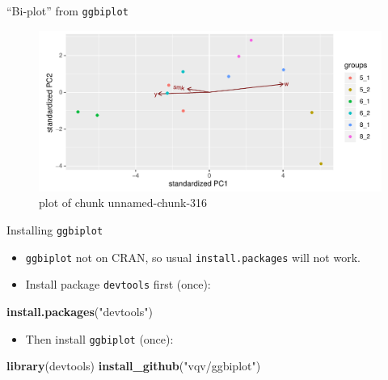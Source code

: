 \documentclass[ignorenonframetext,]{beamer}
\newenvironment{Shaded}{\begin{snugshade}}{\end{snugshade}}
\newcommand{\DataTypeTok}[1]{\textcolor[rgb]{0.13,0.29,0.53}{#1}}
\newcommand{\FloatTok}[1]{\textcolor[rgb]{0.00,0.00,0.81}{#1}}
\newcommand{\KeywordTok}[1]{\textcolor[rgb]{0.13,0.29,0.53}{\textbf{#1}}}
\newcommand{\NormalTok}[1]{#1}
\newcommand{\OperatorTok}[1]{\textcolor[rgb]{0.81,0.36,0.00}{\textbf{#1}}}
\newcommand{\StringTok}[1]{\textcolor[rgb]{0.31,0.60,0.02}{#1}}
\providecommand{\tightlist}{%
  \setlength{\itemsep}{0pt}\setlength{\parskip}{0pt}}
\begin{document}
\begin{frame}[fragile]{``Bi-plot'' from \texttt{ggbiplot}}
\protect\hypertarget{bi-plot-from-ggbiplot}{}

\begin{Shaded}
\end{Shaded}

\begin{figure}
\centering
\includegraphics{figure/unnamed-chunk-316-1.pdf}
\caption{plot of chunk unnamed-chunk-316}
\end{figure}

\end{frame}

\begin{frame}[fragile]{Installing \texttt{ggbiplot}}
\protect\hypertarget{installing-ggbiplot}{}

\begin{itemize}
\item
  \texttt{ggbiplot} not on CRAN, so usual \texttt{install.packages} will
  not work.
\item
  Install package \texttt{devtools} first (once):
\end{itemize}

\begin{Shaded}
\begin{Highlighting}[]
\KeywordTok{install.packages}\NormalTok{(}\StringTok{"devtools"}\NormalTok{)}
\end{Highlighting}
\end{Shaded}

\begin{itemize}
\tightlist
\item
  Then install \texttt{ggbiplot} (once):
\end{itemize}

\begin{Shaded}
\begin{Highlighting}[]
\KeywordTok{library}\NormalTok{(devtools)}
\KeywordTok{install_github}\NormalTok{(}\StringTok{"vqv/ggbiplot"}\NormalTok{)}
\end{Highlighting}
\end{Shaded}

\end{frame}
\end{document}
